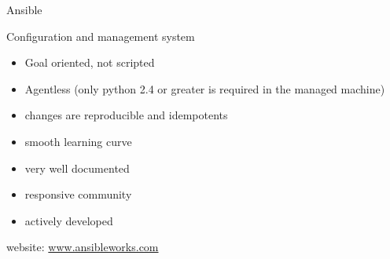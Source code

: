 \documentclass[english,serif,mathserif,usenames,dvipsnames]{beamer}
\begin{document}
\begin{frame}
  {Ansible}
  
  Configuration and management system
  \begin{itemize}
  \item Goal oriented, not scripted
  \item Agentless (only python 2.4 or greater is required in the
    managed machine)
  \item changes are reproducible and idempotents
  \item smooth learning curve
  \item very well documented
  \item responsive community
  \item actively developed
  \end{itemize}

  \+
  website: \url{www.ansibleworks.com}

\end{frame}




\end{document}
